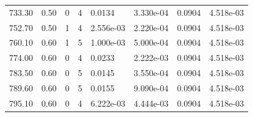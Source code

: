 \documentclass[preview]{standalone}
\begin{document}
{{{{\begin{tabular}{L{1.2cm}C{1.2cm} C{0.3cm}C{0.5cm} C{1.4cm}C{1.4cm} C{1.4cm}C{1.4cm}}
  733.30  &  0.50  & 0     &  4 &  0.0134  & 3.330e-04  & 0.0904 &  4.518e-03   \\ 
  752.70  &  0.50  & 1     &  4 &  2.556e-03  & 2.220e-04  & 0.0904 &  4.518e-03   \\ 
  760.10  &  0.60  & 1     &  5 &  1.000e-03  & 5.000e-04  & 0.0904 &  4.518e-03   \\ 
  774.00  &  0.60  & 0     &  4 &  0.0233  & 2.222e-03  & 0.0904 &  4.518e-03   \\ 
  783.50  &  0.60  & 0     &  5 &  0.0145  & 3.550e-04  & 0.0904 &  4.518e-03   \\ 
  789.60  &  0.60  & 0     &  5 &  0.0155  & 9.090e-04  & 0.0904 &  4.518e-03   \\ 
  795.10  &  0.60  & 0     &  4 &  6.222e-03  & 4.444e-03  & 0.0904 &  4.518e-03   \\ 
\hline 
\end{tabular} 

}}}}
\end{document}
